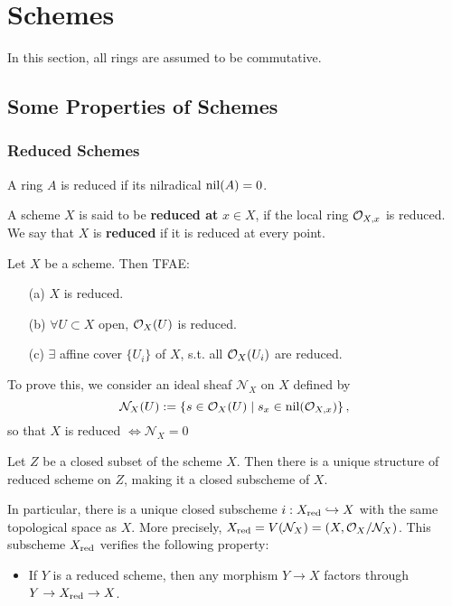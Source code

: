 \section{Schemes}
In this section, all rings are assumed to be commutative.

\subsection{Some Properties of Schemes}

\subsubsection{Reduced Schemes}

A ring $A$ is reduced if its nilradical
$\operatorname{nil}(A) = 0$.

A scheme $X$ is said to be \textbf{reduced at} $x\in X$,
if the local ring $\mathcal{O}_{X, x}$ is reduced.
We say that $X$ is \textbf{reduced} if it is reduced at every point.

\begin{proposition}\label{reduced is Zariski local}
    Let $X$ be a scheme. Then TFAE:
    \begin{enumerate}
    \item [(a)] $X$ is reduced.
    \item [(b)] $\forall U\subset X$ open, $\mathcal{O}_X(U)$ is reduced.
    \item [(c)] $\exists$ affine cover $\{U_i\}$ of $X$, s.t. all $\mathcal{O}_X(U_i)$ are reduced.
    \end{enumerate}
\end{proposition}

To prove this, we consider an ideal sheaf $\mathcal{N}_X$ on $X$ defined by
\[\mathcal{N}_X(U) := \left\{s\in \mathcal{O}_X(U)\mid s_x\in\operatorname{nil}(\mathcal{O}_{X, x})\right\},\]
so that $X$ is reduced $\iff\mathcal{N}_X = 0$


\begin{proposition}\label{reduced subscheme structure on closed subset}
    Let $Z$ be a closed subset of the scheme $X$.
    Then there is a unique structure of reduced scheme on $Z$, making it a closed subscheme of $X$.

    In particular, there is a unique closed subscheme $i : X_{\operatorname{red}}\hookrightarrow X$
    with the same topological space as $X$.
    More precisely, $X_{\operatorname{red}} = V(\mathcal{N}_X) = (X, \mathcal{O}_X/\mathcal{N}_X)$.
    This subscheme $X_{\operatorname{red}}$ verifies the following property:
    \begin{itemize}
        \item If $Y$ is a reduced scheme,
        then any morphism $Y\to X$ factors through $Y\to X_{\operatorname{red}}\to X$.
    \end{itemize}
\end{proposition}

